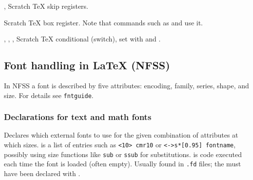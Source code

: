 \documentclass{l3in2edoc}
\begin{document}
\begin{function}[]
  {
    \@tempskipa,
    \@tempskipb
  }
  Scratch \TeX{} skip registers.

\end{function}



\begin{function}[]
  {
    \@tempboxa
  }
  Scratch \TeX{} box register. Note that commands such as
   and  use it.

\end{function}






\begin{function}[]
  {
    \if@tempswa,
    \@tempswafalse,
    \@tempswatrue,
  }
  Scratch \TeX{} conditional (switch), set with 
  and .

\end{function}






\subsection{Font handling in \LaTeX{} (NFSS)}

In NFSS a font is described by five attributes: encoding, family,
series, shape, and size. For details see \texttt{fntguide}.

\subsubsection{Declarations for text and math fonts}



\begin{function}[user]
  {
    \DeclareFontShape
  }
  \begin{syntax}
          
  \end{syntax}
  Declares which external fonts to use for the given combination of
  attributes at which sizes.  is a list of entries
  such as \texttt{<10> cmr10} or \texttt{<->s*[0.95] fontname},
  possibly using size functions like \texttt{sub} or \texttt{ssub}
  for substitutions.  is code executed each time the
  font is loaded (often empty). Usually found in \texttt{.fd} files;
  the  must have been declared with .
\end{function}
\end{document}
